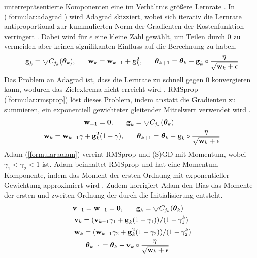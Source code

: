 unterrepräsentierte Komponenten eine im Verhältnis größere Lernrate \cite{duchi2011adaptive}.
In (\ref{formular:adagrad}) wird Adagrad skizziert, wobei sich iterativ die Lernrate antiproportional
zur kummulierten Norm der Gradienten der Kostenfunktion verringert \cite{lydia2019adagrad, kingma2014adam}.
Dabei wird für $\epsilon$ eine kleine Zahl gewählt, um Teilen durch 0 zu vermeiden aber keinen signifikanten Einfluss auf die Berechnung zu haben.
\begin{align}
    \label{formular:adagrad}
    \textbf{g}_k = \bigtriangledown C_{j_k}(\boldsymbol\theta_k), \hspace{0.6cm}
    \textbf{w}_k = \textbf{w}_{k-1} + \textbf{g}_k^2, \hspace{0.6cm}
    \boldsymbol\theta_{k+1} = \boldsymbol\theta_k - \textbf{g}_k \circ \frac{\eta}{\sqrt{\textbf{w}_k + \epsilon}}
\end{align}
Das Problem an Adagrad ist, dass die Lernrate zu schnell gegen 0 konvergieren kann, wodurch das Zielextrema nicht erreicht wird \cite{bengio2017deep}.
RMSprop \cite{hinton2012neural} (\ref{formular:rmsprop}) löst dieses Problem, indem anstatt die Gradienten zu summieren, ein
exponentiell gewichteter gleitender Mittelwert verwendet wird \cite{bengio2017deep}.
\begin{align}
    \label{formular:rmsprop}
    \textbf{w}_{-1} = \textbf{0}, \hspace{0.6cm}
    \textbf{g}_k = \bigtriangledown C_{j_k}(\boldsymbol\theta_k) \hspace{2.3cm} \nonumber\\
    \textbf{w}_k = \textbf{w}_{k-1}\gamma + \textbf{g}_k^2 (1-\gamma), \hspace{0.6cm}
    \boldsymbol\theta_{k+1} = \boldsymbol\theta_k - \textbf{g}_k \circ \frac{\eta}{\sqrt{\textbf{w}_k + \epsilon}}
\end{align}
Adam (\ref{formular:adam}) vereint RMSprop und (S)GD mit Momentum, wobei $\gamma_1 < \gamma_2 < 1$ \cite{kingma2014adam} ist.
Adam beinhaltet RMSprop und hat eine Momentum Komponente, indem das Moment der ersten Ordnung mit exponentieller Gewichtung approximiert wird \cite{bengio2017deep}.
Zudem korrigiert Adam den Bias das Momente der ersten und zweiten Ordnung der durch die Initialisierung entsteht.
\begin{align}
    \label{formular:adam}
    \textbf{v}_{-1} = \textbf{w}_{-1} = \textbf{0}, \hspace{0.6cm}
    \textbf{g}_k = \bigtriangledown C_{j_k}(\boldsymbol\theta_k) \hspace{0.4cm} \nonumber\\
    \textbf{v}_k = (\textbf{v}_{k-1}\gamma_1 + \textbf{g}_k (1-\gamma_1))/(1 - \gamma_1^k) \hspace{0.15cm} \nonumber\\
    \textbf{w}_k = (\textbf{w}_{k-1}\gamma_2 + \textbf{g}_k^2 (1-\gamma_2))/(1 - \gamma_2^k) \nonumber\\
    \boldsymbol\theta_{k+1} = \boldsymbol\theta_k - \textbf{v}_k \circ \frac{\eta}{\sqrt{\textbf{w}_k + \epsilon}} \hspace{1.1cm}
\end{align}